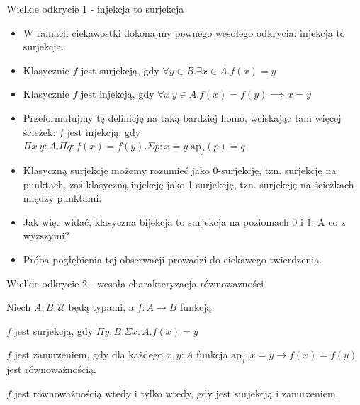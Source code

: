 \documentclass{beamer}
\newcommand{\U}{\mathcal{U}}
\newcommand{\ap}[2]{\text{ap}_{#1}(#2)}
\begin{document}
\begin{frame}{Wielkie odkrycie 1 - injekcja to surjekcja}
\begin{itemize}
	\item W ramach ciekawostki dokonajmy pewnego wesołego odkrycia: injekcja to surjekcja.
	\item Klasycznie $f$ jest surjekcją, gdy $\forall y \in B. \exists x \in A. f(x) = y$
	\item Klasycznie $f$ jest injekcją, gdy $\forall x\ y \in A. f(x) = f(y) \implies x = y$
	\item Przeformułujmy tę definicję na taką bardziej homo, wciskając tam więcej ścieżek: $f$ jest injekcją, gdy $\Pi x\ y : A. \Pi q : f(x) = f(y). \Sigma p : x = y. \ap{f}{p} = q$
	\item Klasyczną surjekcję możemy rozumieć jako 0-surjekcję, tzn. surjekcję na punktach, zaś klasyczną injekcję jako 1-surjekcję, tzn. surjekcję na ścieżkach między punktami.
	\item Jak więc widać, klasyczna bijekcja to surjekcja na poziomach $0$ i $1$. A co z wyższymi?
	\item Próba pogłębienia tej obserwacji prowadzi do ciekawego twierdzenia.
\end{itemize}
\end{frame}

\begin{frame}{Wielkie odkrycie 2 - wesoła charakteryzacja równoważności}

Niech $A, B : \U$ będą typami, a $f: A \to B$ funkcją.

\begin{definition}
$f$ jest surjekcją, gdy $\Pi y : B. \Sigma x : A. f(x) = y$
\end{definition}

\begin{definition}[Zanurzenie]
$f$ jest zanurzeniem, gdy dla każdego $x, y : A$ funkcja $\text{ap}_f : x = y \to f(x) = f(y)$ jest równoważnością.
\end{definition}

\begin{theorem}
$f$ jest równoważnością wtedy i tylko wtedy, gdy jest surjekcją i zanurzeniem.
\end{theorem}

\end{frame}
\end{document}

